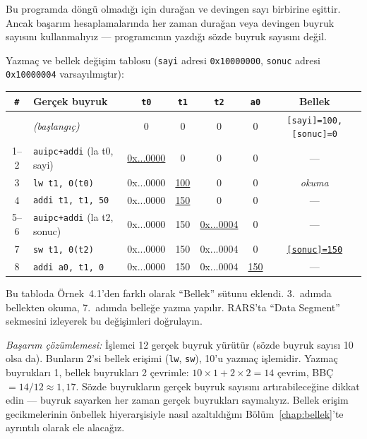 \begin{ornek}[4.2]
Bu programda döngü olmadığı için durağan ve devingen sayı birbirine eşittir. Ancak başarım hesaplamalarında her zaman durağan veya devingen buyruk sayısını kullanmalıyız --- programcının yazdığı sözde buyruk sayısını değil.

Yazmaç ve bellek değişim tablosu (\texttt{sayi} adresi \texttt{0x10000000}, \texttt{sonuc} adresi \texttt{0x10000004} varsayılmıştır):

\begin{center}
\small
\begin{tabular}{clccccc}
\toprule
\texttt{\#} & Gerçek buyruk & \texttt{t0} & \texttt{t1} & \texttt{t2} & \texttt{a0} & Bellek \\
\midrule
   & \emph{(başlangıç)} & 0 & 0 & 0 & 0 & \texttt{[sayi]=100, [sonuc]=0} \\
1--2 & \texttt{auipc+addi} (la t0, sayi) & \underline{0x...0000} & 0 & 0 & 0 & --- \\
3 & \texttt{lw t1, 0(t0)} & 0x...0000 & \underline{100} & 0 & 0 & \emph{okuma} \\
4 & \texttt{addi t1, t1, 50} & 0x...0000 & \underline{150} & 0 & 0 & --- \\
5--6 & \texttt{auipc+addi} (la t2, sonuc) & 0x...0000 & 150 & \underline{0x...0004} & 0 & --- \\
7 & \texttt{sw t1, 0(t2)} & 0x...0000 & 150 & 0x...0004 & 0 & \underline{\texttt{[sonuc]=150}} \\
8 & \texttt{addi a0, t1, 0} & 0x...0000 & 150 & 0x...0004 & \underline{150} & --- \\
\bottomrule
\end{tabular}
\end{center}

Bu tabloda Örnek~4.1'den farklı olarak ``Bellek'' sütunu eklendi. 3.~adımda bellekten okuma, 7.~adımda belleğe yazma yapılır. RARS'ta ``Data Segment'' sekmesini izleyerek bu değişimleri doğrulayın.

\emph{Başarım çözümlemesi:} İşlemci 12 gerçek buyruk yürütür (sözde buyruk sayısı 10 olsa da). Bunların 2'si bellek erişimi (\texttt{lw}, \texttt{sw}), 10'u yazmaç işlemidir. Yazmaç buyrukları 1, bellek buyrukları 2 çevrimle: $10 \times 1 + 2 \times 2 = 14$ çevrim, BBÇ~$= 14/12 \approx 1{,}17$. Sözde buyrukların gerçek buyruk sayısını artırabileceğine dikkat edin --- buyruk sayarken her zaman gerçek buyrukları saymalıyız. Bellek erişim gecikmelerinin önbellek hiyerarşisiyle nasıl azaltıldığını Bölüm~\ref{chap:bellek}'te ayrıntılı olarak ele alacağız.
\end{ornek}

